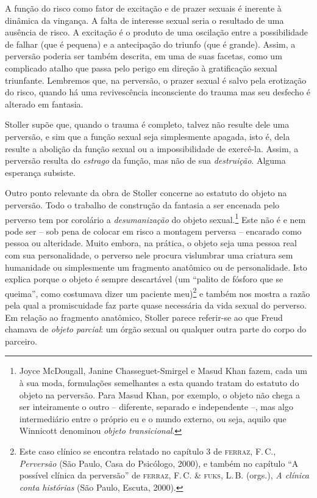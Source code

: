 A função do risco como fator de excitação e de prazer sexuais é inerente
à dinâmica da vingança. A falta de interesse sexual seria o resultado de
uma ausência de risco. A excitação é o produto de uma oscilação entre a
possibilidade de falhar (que é pequena) e a antecipação do triunfo (que
é grande). Assim, a perversão poderia ser também descrita, em uma de
suas facetas, como um complicado atalho que passa pelo perigo em direção
à gratificação sexual triunfante. Lembremos que, na perversão, o prazer
sexual é salvo pela erotização do risco, quando há uma revivescência
inconsciente do trauma mas seu desfecho é alterado em fantasia.

Stoller supõe que, quando o trauma é completo, talvez não resulte dele
uma perversão, e sim que a função sexual seja simplesmente apagada, isto
é, dela resulte a abolição da função sexual ou a impossibilidade de
exercê-la. Assim, a perversão resulta do \emph{estrago} da função, mas
não de sua \emph{destruição}. Alguma esperança subsiste.

Outro ponto relevante da obra de Stoller concerne ao estatuto do objeto
na perversão. Todo o trabalho de construção da fantasia a ser encenada
pelo perverso tem por corolário a \emph{desumanização} do objeto
sexual.\footnote{Joyce McDougall, Janine Chasseguet-Smirgel e Masud Khan
  fazem, cada um à sua moda, formulações semelhantes a esta quando
  tratam do estatuto do objeto na perversão. Para Masud Khan, por
  exemplo, o objeto não chega a ser inteiramente o outro -- diferente,
  separado e independente --, mas algo intermediário entre o próprio eu
  e o mundo externo, ou seja, aquilo que Winnicott denominou
  \emph{objeto transicional}.} Este não é e nem pode ser -- sob pena de
colocar em risco a montagem perversa -- encarado como pessoa ou
alteridade. Muito embora, na prática, o objeto seja uma pessoa real com
sua personalidade, o perverso nele procura vislumbrar uma criatura sem
humanidade ou simplesmente um fragmento anatômico ou de personalidade.
Isto explica porque o objeto é sempre descartável (um ``palito de
fósforo que se queima'', como costumava dizer um paciente meu)\footnote{Este
  caso clínico se encontra relatado no capítulo 3 de \textsc{ferraz},
  F.\,C., \emph{Perversão} (São Paulo, Casa do Psicólogo, 2000), e também
  no capítulo ``A possível clínica da perversão'' de \textsc{ferraz},
  F.\,C. \& \textsc{fuks}, L.\,B. (orgs.), \emph{A clínica conta histórias}
  (São Paulo, Escuta, 2000).} e também nos mostra a razão pela qual a
promiscuidade faz parte quase necessária da vida sexual do perverso. Em
relação ao fragmento anatômico, Stoller parece referir-se ao que Freud
chamava de \emph{objeto parcial}: um órgão sexual ou qualquer outra
parte do corpo do parceiro.

